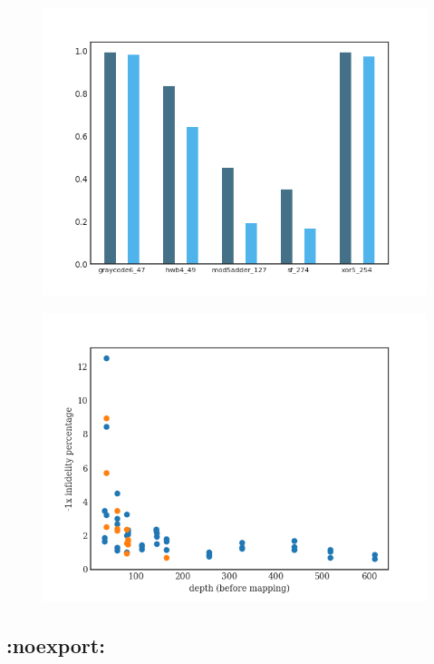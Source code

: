 \label{tab:map_selected_benchs}
\begin{figure}[htbp]
\centering
\includegraphics[width=\textwidth]{figures/f_diff_bar_plot.png}
\caption{\label{fig:orgdd3a509}
}
\end{figure}
\begin{figure}[htbp]
\centering
\includegraphics[width=\textwidth]{figures/infid_percentage_depth_before_mapping.png}
\caption{\label{fig:org9be5637}
}
\end{figure}


\subsection*{:noexport:}
\label{sec:orgd07399d}

